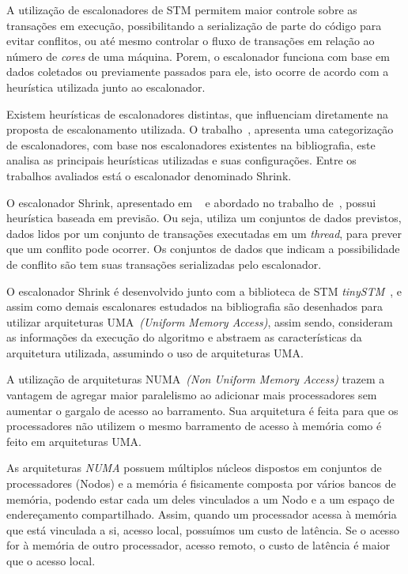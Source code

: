 \documentclass[diss-proposta,nocipinfo]{texufpel}
\begin{document}
A utilização de escalonadores de STM permitem maior controle sobre as transações em execução, possibilitando a serialização de parte do código para evitar conflitos, ou até mesmo controlar o fluxo de transações em relação ao número de \emph{cores} de uma máquina. Porem, o escalonador funciona com base em dados coletados ou previamente passados para ele, isto ocorre de acordo com a heurística utilizada junto ao escalonador.

Existem heurísticas de escalonadores distintas, que influenciam diretamente na proposta de escalonamento utilizada. O trabalho~\cite{sanzo17}, apresenta uma categorização de escalonadores, com base nos escalonadores existentes na bibliografia, este analisa as principais heurísticas utilizadas e suas configurações. Entre os trabalhos avaliados está o escalonador denominado Shrink.

O escalonador Shrink, apresentado em ~\cite{dragojevic09} e abordado no trabalho de~\cite{sanzo17}, possui heurística baseada em previsão. Ou seja, utiliza um conjuntos de dados previstos, dados lidos por um conjunto de transações executadas em um \emph{thread}, para prever que um conflito pode ocorrer. Os conjuntos de dados que indicam a possibilidade de conflito são tem suas transações serializadas pelo escalonador.

O escalonador Shrink é desenvolvido junto com a biblioteca de STM \emph{tinySTM}~\cite{TINY}, e assim como demais escalonares estudados na bibliografia são desenhados para utilizar arquiteturas UMA~\emph{(Uniform Memory Access)}, assim sendo, consideram as informações da execução do algoritmo e abstraem as características da arquitetura utilizada, assumindo o uso de arquiteturas UMA.

A utilização de arquiteturas NUMA~\emph{(Non Uniform Memory Access)} trazem a vantagem de agregar maior paralelismo ao adicionar mais processadores sem aumentar o gargalo de acesso ao barramento. Sua arquitetura é feita para que os processadores não utilizem o mesmo barramento de acesso à memória como é feito em arquiteturas UMA.

As arquiteturas \emph{NUMA} possuem múltiplos núcleos dispostos em conjuntos de processadores (Nodos) e a memória é fisicamente composta por vários bancos de memória, podendo estar cada um deles vinculados a um Nodo e a um espaço de endereçamento compartilhado. Assim, quando um processador acessa à memória que está vinculada a si, acesso local, possuímos um custo de latência. Se o acesso for à memória de outro processador, acesso remoto, o custo de latência é maior que o acesso local.
\end{document}
